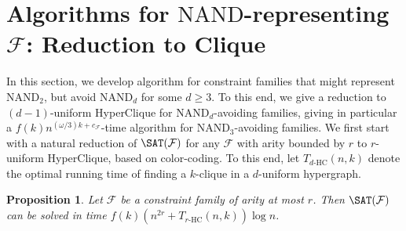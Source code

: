 \documentclass[10pt,a4paper]{article}
\theoremstyle{plain}
\newtheorem{prop}[thm]{Proposition}
\newcommand{\NAND}{\mathrm{NAND}}
\newcommand{\confam}{\mathcal{F}}
\newcommand{\THC}[1]{T_{#1\text{-HC}}}
\begin{document}
\section{Algorithms for $\NAND$-representing $\confam$: Reduction to Clique}
\label{sec:redToClique}
%
In this section, we develop algorithm for constraint families that might represent $\NAND_2$, but avoid $\NAND_d$ for some $d\ge 3$. To this end, we give a reduction to $(d-1)$-uniform HyperClique for $\NAND_d$-avoiding families, giving in particular a $f(k)n^{(\omega/3)k+c_\confam}$-time algorithm for $\NAND_3$-avoiding families. 
%
We first start with a natural reduction of $\SAT(\confam)$ for any $\confam$ with arity bounded by $r$ to $r$-uniform HyperClique, based on color-coding. To this end, let $\THC{d}(n,k)$ denote the optimal running time of finding a $k$-clique in a $d$-uniform hypergraph.
\begin{prop}\label{prop:aritybaseline}
Let $\confam$ be a constraint family of arity at most $r$. Then $\SAT(\confam)$ can be solved in time $f(k)(n^{2r} + \THC{r}(n,k))\log n$.
\end{prop}
\end{document}
